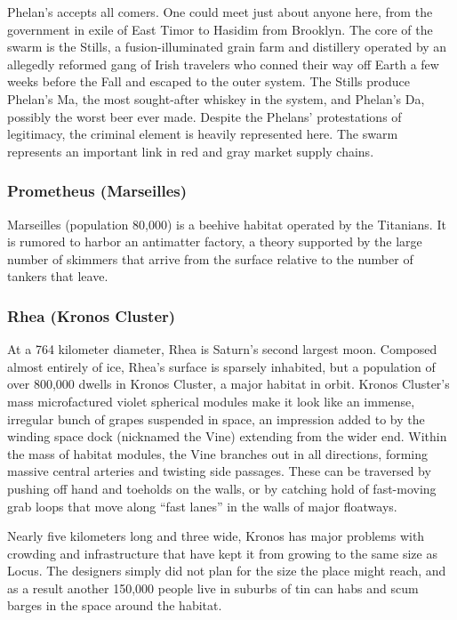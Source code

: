 Phelan's accepts all comers. One could meet just about anyone here,
from the government in exile of East Timor to Hasidim from
Brooklyn. The core of the swarm is the Stills, a fusion-illuminated
grain farm and distillery operated by an allegedly reformed gang of
Irish travelers who conned their way off Earth a few weeks before the
Fall and escaped to the outer system. The Stills produce Phelan's Ma,
the most sought-after whiskey in the system, and Phelan's Da, possibly
the worst beer ever made. Despite the Phelans' protestations of
legitimacy, the criminal element is heavily represented here. The
swarm represents an important link in red and gray market supply
chains.

\subsubsection{Prometheus (Marseilles)}
\label{sec:prom-mars}

Marseilles (population 80,000) is a beehive habitat operated by the
Titanians. It is rumored to harbor an antimatter factory, a theory
supported by the large number of skimmers that arrive from the surface
relative to the number of tankers that leave.

\subsubsection{Rhea (Kronos Cluster)}
\label{sec:rhea-kronos-cluster}

At a 764 kilometer diameter, Rhea is Saturn's second largest
moon. Composed almost entirely of ice, Rhea's surface is sparsely
inhabited, but a population of over 800,000 dwells in Kronos Cluster,
a major habitat in orbit. Kronos Cluster's mass microfactured violet
spherical modules make it look like an immense, irregular bunch of
grapes suspended in space, an impression added to by the winding space
dock (nicknamed the Vine) extending from the wider end. Within the
mass of habitat modules, the Vine branches out in all directions,
forming massive central arteries and twisting side passages. These can
be traversed by pushing off hand and toeholds on the walls, or by
catching hold of fast-moving grab loops that move along “fast lanes”
in the walls of major floatways.

Nearly five kilometers long and three wide, Kronos has major problems
with crowding and infrastructure that have kept it from growing to the
same size as Locus. The designers simply did not plan for the size the
place might reach, and as a result another 150,000 people live in
suburbs of tin can habs and scum barges in the space around the
habitat.

